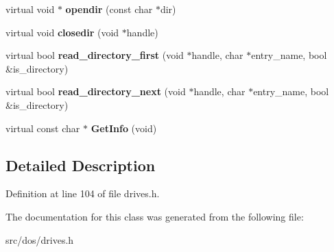 \begin{DoxyCompactItemize}
\item 
\hypertarget{classphysfsDrive_a756307aafafedac089329c0e3b7505a6}{virtual void $\ast$ {\bfseries opendir} (const char $\ast$dir)}\label{classphysfsDrive_a756307aafafedac089329c0e3b7505a6}

\item 
\hypertarget{classphysfsDrive_ac84586904d9a42b12269ccbf544bc9c9}{virtual void {\bfseries closedir} (void $\ast$handle)}\label{classphysfsDrive_ac84586904d9a42b12269ccbf544bc9c9}

\item 
\hypertarget{classphysfsDrive_a4bf2acd16cce99b4dcb8c3dade56ff59}{virtual bool {\bfseries read\-\_\-directory\-\_\-first} (void $\ast$handle, char $\ast$entry\-\_\-name, bool \&is\-\_\-directory)}\label{classphysfsDrive_a4bf2acd16cce99b4dcb8c3dade56ff59}

\item 
\hypertarget{classphysfsDrive_aa238b0a78e9f4fec38032b52c09d4f3f}{virtual bool {\bfseries read\-\_\-directory\-\_\-next} (void $\ast$handle, char $\ast$entry\-\_\-name, bool \&is\-\_\-directory)}\label{classphysfsDrive_aa238b0a78e9f4fec38032b52c09d4f3f}

\item 
\hypertarget{classphysfsDrive_a072fae9f05ddcd030b6c20997b4a6a21}{virtual const char $\ast$ {\bfseries Get\-Info} (void)}\label{classphysfsDrive_a072fae9f05ddcd030b6c20997b4a6a21}

\end{DoxyCompactItemize}


\subsection{Detailed Description}


Definition at line 104 of file drives.\-h.



The documentation for this class was generated from the following file\-:\begin{DoxyCompactItemize}
\item 
src/dos/drives.\-h\end{DoxyCompactItemize}
